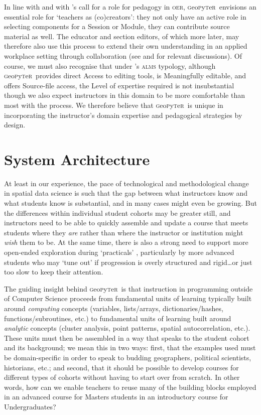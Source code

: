 \documentclass[letter, 11pt,titlepage]{article}
\newcommand{\gp}{\textsc{g}eo\textsc{p}y\textsc{t}e\textsc{r}~\/}
\begin{document}
In line with \citet{Mishra2017} and with \citeauthor{Knox2013}'s \citeyearpar{Knox2013} call for a role for pedagogy in \textsc{oer}, \gp envisions an essential role for `teachers as (co)creators': they not only have an active role in selecting components for a Session or Module, they can contribute source material as well. The educator and section editors, of which more later, may therefore also use this process to extend their own understanding in an applied workplace setting through collaboration (see \citealp{littlejohn2017} and \citealp{eraut2008} for relevant discussions). Of course, we must also recognise that under \citeauthor{Wiley2009}'s \citeyearpar{Wiley2009} \textsc{alms} typology, although \gp provides direct Access to editing tools, is Meaningfully editable, and offers Source-file access, the Level of expertise required is not insubstantial though we also expect instructors in this domain to be more comfortable than most with the process. We therefore believe that \gp is unique in incorporating the instructor's domain expertise and pedagogical strategies by design. 

\section{System Architecture}\label{system-architecture}

At least in our experience, the pace of technological and methodological change in spatial data science is such that the gap between what instructors know and what students know is substantial, and in many cases might even be growing. But the differences within individual student cohorts may be greater still, and instructors need to be able to quickly assemble and update a course that meets students where they \emph{are} rather than where the instructor or institution might \emph{wish} them to be. At the same time, there is also a strong need to support more open-ended exploration during `practicals' \citep{Unwin1980}, particularly by more advanced students who may `tune out' if progression is overly structured and rigid\ldots or just too slow to keep their attention.

The guiding insight behind \gp is that instruction in programming outside of Computer Science proceeds from fundamental units of learning typically built around \emph{computing} concepts (variables, lists/arrays, dictionaries/hashes, functions/subroutines, etc.) to fundamental units of learning built around \emph{analytic} concepts (cluster analysis, point patterns, spatial autocorrelation, etc.). These units must then be assembled in a way that speaks to the student cohort and its background; we mean this in two ways: first, that the examples used must be domain-specific in order to speak to budding geographers, political scientists, historians, etc.; and second, that it should be possible to develop courses for different types of cohorts without having to start over from scratch. In other words, how can we enable teachers to reuse many of the building blocks employed in an advanced course for Masters students in an introductory course for Undergraduates?
\end{document}
